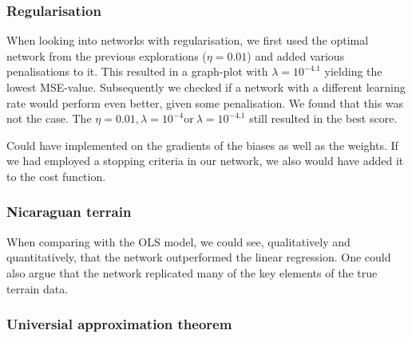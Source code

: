 

        \subsubsection{Regularisation}
            When looking into networks with regularisation, we first used the optimal network from the previous explorations ($\eta = 0.01$) and added various penalisations to it. This resulted in a graph-plot with $\lambda= 10^{-4.1}$ yielding the lowest MSE-value. Subsequently we checked if a network with a different learning rate would perform even better, given some penalisation. We found that this was not the case. The $\eta = 0.01, \lambda = 10^{-4} \text{or} \ \lambda = 10^{-4.1}$ still resulted in the best score. 

            Could have implemented on the gradients of the biases as well as the weights.  If we had employed a stopping criteria in our network, we also would have added it to the cost function. 

        \subsubsection{Nicaraguan terrain}
            When comparing with the OLS model, we could see, qualitatively and quantitatively, that the network outperformed the linear regression. One could also argue that the network replicated many of the key elements of the true terrain data.  
            
        \subsubsection{Universial approximation theorem}

